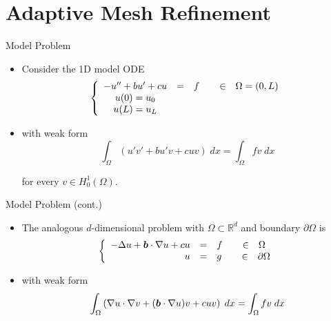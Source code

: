 \section{Adaptive Mesh Refinement}
\begin{frame}{Model Problem}
\begin{itemize}
  \item Consider the 1D model ODE
    \begin{equation}
      \left\{
	\begin{array}{ccc}
	  -u'' + bu' +cu &=& f \hspace{.25in} \in \hspace{.1in} \Omega = (0,L) \\
	  u(0) =  u_0   && \\
	  u(L) =  u_L	&&
	\end{array}
	\right.
    \end{equation}

  \item with weak form
    \begin{equation}
      \int_{\Omega} \left( u' v' + b u' v + cuv \right) \; dx = \int_{\Omega} fv \; dx
    \end{equation}

    for every $v \in H^1_0 (\Omega)$.
\end{itemize}
\end{frame}


\begin{frame}{Model Problem (cont.)}
\begin{itemize}
\item The analogous $d$-dimensional problem with $\Omega \subset \mathbb{R}^d$
  and boundary $\partial \Omega$ is
    \begin{equation}
      \left\{
	\begin{array}{ccl}
	  -\Delta u + \bv{b} \cdot \nabla u + cu &=& f
	  \hspace{.25in} \in \hspace{.1in} \Omega  \\
	  \phantom{-\Delta u + \bv{b} \cdot \nabla u + c}u & = & g
	  \hspace{.25in} \in \hspace{.1in} \partial \Omega
	\end{array}
	\right.
    \end{equation}

  \item with weak form
    \begin{equation}
      \int_{\Omega} \left( \nabla u \cdot \nabla v + ({\boldsymbol{b}} \cdot \nabla u) v + cuv \right) \; dx = \int_{\Omega} fv \; dx
    \end{equation}

\end{itemize}

\end{frame}


